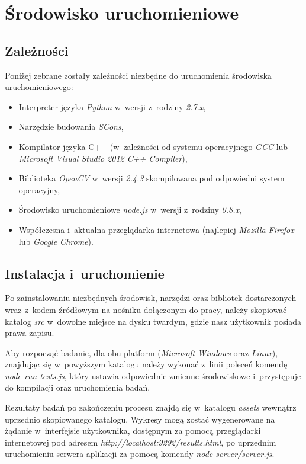 \chapter{Środowisko uruchomieniowe}\label{Chapter_EnvironmentAppendix}

  \section{Zależności}\label{Section_Dependencies}

    Poniżej zebrane zostały zależności niezbędne do uruchomienia środowiska uruchomieniowego:
      \begin{itemize}
        \item Interpreter języka \textit{Python} w~wersji z~rodziny \textit{2.7.x},
        \item Narzędzie budowania \textit{SCons},
        \item Kompilator języka C++ (w~zależności od systemu operacyjnego \textit{GCC} lub \textit{Microsoft Visual Studio 2012 C++ Compiler}),
        \item Biblioteka \textit{OpenCV} w~wersji \textit{2.4.3} skompilowana pod odpowiedni system operacyjny,
        \item Środowisko uruchomieniowe \textit{node.js} w~wersji z~rodziny \textit{0.8.x},
        \item Współczesna i~aktualna przeglądarka internetowa (najlepiej \textit{Mozilla Firefox} lub \textit{Google Chrome}).
      \end{itemize}

  \section{Instalacja i~uruchomienie}\label{Section_Installation}

    Po zainstalowaniu niezbędnych środowisk, narzędzi oraz bibliotek dostarczonych wraz z~kodem źródłowym na nośniku dołączonym do pracy, należy skopiować katalog \textit{src} w~dowolne miejsce na dysku twardym, gdzie nasz użytkownik posiada prawa zapisu.

    Aby rozpocząć badanie, dla obu platform (\textit{Microsoft Windows} oraz \textit{Linux}), znajdując się w~powyższym katalogu należy wykonać z~linii poleceń komendę \textit{node run-tests.js}, który ustawia odpowiednie zmienne środowiskowe i~przystępuje do kompilacji oraz uruchomienia badań.

    Rezultaty badań po zakończeniu procesu znajdą się w~katalogu \textit{assets} wewnątrz uprzednio skopiowanego katalogu. Wykresy mogą zostać wygenerowane na żądanie w~interfejsie użytkownika, dostępnym za pomocą przeglądarki internetowej pod adresem \textit{http://localhost:9292/results.html}, po uprzednim uruchomieniu serwera aplikacji za pomocą komendy \textit{node server/server.js}.